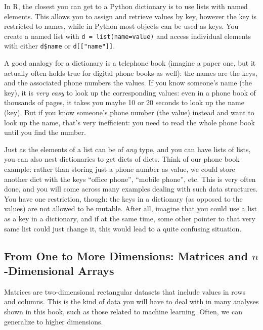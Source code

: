 In R, the closest you can get to a Python dictionary is to use lists with named elements.
This allows you to assign and retrieve values by key,
however the key is restricted to names, while in Python most objects can be used as keys.
You create a named list with \verb|d = list(name=value)| and access individual elements with either
\verb|d$name| or \verb|d[["name"]]|.


A good analogy for a dictionary is a telephone book (imagine a paper
one, but it actually often holds true for digital phone books as
well): the names are the keys, and the associated phone numbers the
values. If you know someone's name (the key), it is \emph{very easy}
to look up the corresponding values: even in a phone book of thousands
of pages, it takes you maybe 10 or 20 seconds to look up the name
(key). But if you know someone's phone number (the value) instead and
want to look up the name, that's very inefficient: you need to read
the whole phone book until you find the number.

Just as the elements of a list can be of \emph{any} type, and you can
have lists of lists, you can also nest dictionaries to get dicts of
dicts. Think of our phone book example: rather than storing just a
phone number as value, we could store another dict with the keys
``office phone'', ``mobile phone'', etc. This is very often done, and you
will come across many examples dealing with such data structures.
You have one restriction, though: the keys in a dictionary (as opposed
to the values) are not allowed to be mutable. After all, imagine that
you could use a list as a key in a dictionary, and if at the same time,
some other pointer to that very same list could just change it, this
would lead to a quite confusing situation.




\subsection{From One to More Dimensions: Matrices and $n$-Dimensional Arrays}\label{sec:matrices}

 Matrices are two-dimensional rectangular datasets that include values
in rows and columns. This is the kind of data you will have to deal
with in many analyses shown in this book, such as those related to
machine learning. Often, we can generalize to higher dimensions.

